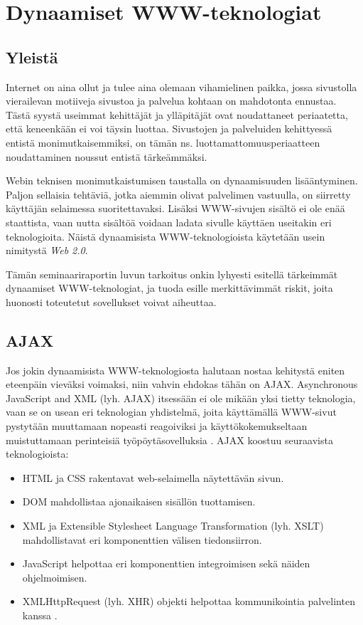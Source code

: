 
\ifdefined\seminaari
\relax
\else
\chapter{Dynaamiset WWW-teknologiat}
\fi

\section{Yleistä}

Internet on aina ollut ja tulee aina olemaan vihamielinen paikka, jossa sivustolla vierailevan motiiveja sivustoa ja palvelua kohtaan on mahdotonta ennustaa. Tästä syystä 
useimmat kehittäjät ja ylläpitäjät ovat noudattaneet periaatetta, että keneenkään ei voi täysin luottaa. Sivustojen ja palveluiden kehittyessä entistä monimutkaisemmiksi,
on tämän ns. luottamattomuusperiaatteen noudattaminen noussut entistä
tärkeämmäksi.

Webin teknisen monimutkaistumisen taustalla on dynaamisuuden
lisääntyminen. Paljon sellaisia tehtäviä, jotka aiemmin olivat
palvelimen vastuulla, on siirretty käyttäjän selaimessa
suoritettavaksi. Lisäksi WWW-sivujen sisältö ei ole enää staattista,
vaan uutta sisältöä voidaan ladata sivulle käyttäen useitakin eri
teknologioita. Näistä dynaamisista WWW-teknologioista käytetään
usein nimitystä \emph{Web 2.0}.

Tämän \ifdefined\seminaari seminaariraportin \else luvun \fi tarkoitus
onkin lyhyesti esitellä tärkeimmät dynaamiset WWW-teknologiat, ja
tuoda esille merkittävimmät riskit, joita huonosti toteutetut
sovellukset voivat aiheuttaa.

\section {AJAX}

Jos jokin dynaamisista WWW-teknologiosta halutaan nostaa kehitystä
eniten eteenpäin vieväksi voimaksi, niin vahvin ehdokas tähän on AJAX.
Asynchronous JavaScript and XML (lyh. AJAX) itsessään ei ole mikään
yksi tietty teknologia, vaan se on usean eri teknologian yhdistelmä,
joita käyttämällä WWW-sivut pystytään muuttamaan nopeasti reagoiviksi
ja käyttökokemukseltaan muistuttamaan perinteisiä työpöytäsovelluksia
\cite{AJAX}. AJAX koostuu seuraavista teknologioista:

\begin{itemize}
\item HTML ja CSS rakentavat web-selaimella näytettävän sivun.
\item DOM mahdollistaa ajonaikaisen sisällön tuottamisen.
\item XML ja Extensible Stylesheet Language Transformation (lyh. XSLT)
  mahdollistavat eri komponenttien välisen tiedonsiirron.
\item JavaScript helpottaa eri komponenttien integroimisen sekä näiden
  ohjelmoimisen.
\item XMLHttpRequest (lyh. XHR) objekti helpottaa kommunikointia
  palvelinten kanssa \cite{WEB2b}.
\end{itemize}

